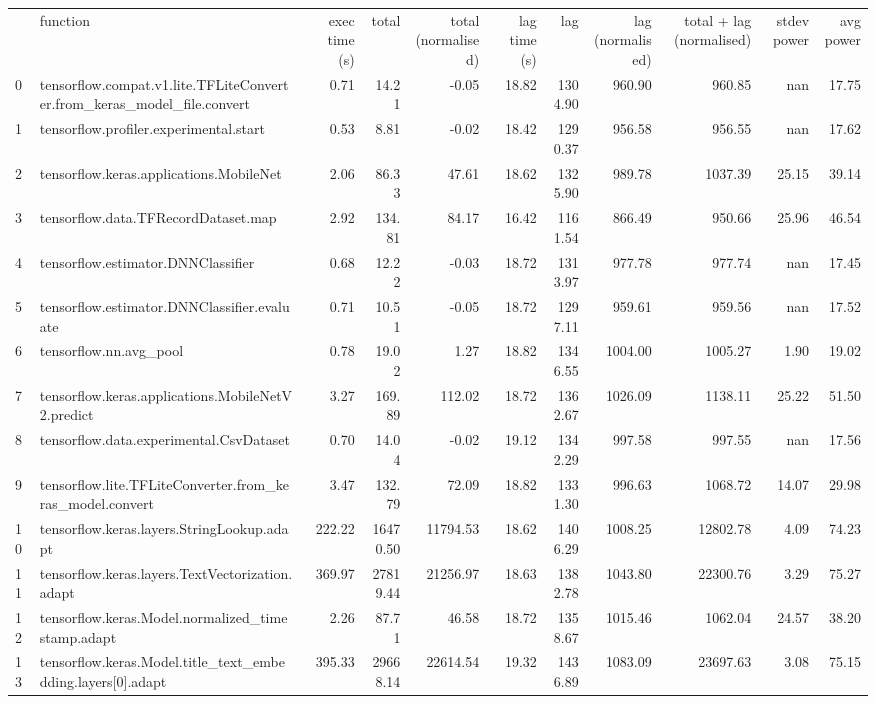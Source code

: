\begin{tabular}{llrrrrrrrrr}
 & function & exec time (s) & total & total (normalised) & lag time (s) & lag & lag (normalised) & total + lag (normalised) & stdev power & avg power \\
0 & tensorflow.compat.v1.lite.TFLiteConverter.from_keras_model_file.convert & 0.71 & 14.21 & -0.05 & 18.82 & 1304.90 & 960.90 & 960.85 & nan & 17.75 \\
1 & tensorflow.profiler.experimental.start & 0.53 & 8.81 & -0.02 & 18.42 & 1290.37 & 956.58 & 956.55 & nan & 17.62 \\
2 & tensorflow.keras.applications.MobileNet & 2.06 & 86.33 & 47.61 & 18.62 & 1325.90 & 989.78 & 1037.39 & 25.15 & 39.14 \\
3 & tensorflow.data.TFRecordDataset.map & 2.92 & 134.81 & 84.17 & 16.42 & 1161.54 & 866.49 & 950.66 & 25.96 & 46.54 \\
4 & tensorflow.estimator.DNNClassifier & 0.68 & 12.22 & -0.03 & 18.72 & 1313.97 & 977.78 & 977.74 & nan & 17.45 \\
5 & tensorflow.estimator.DNNClassifier.evaluate & 0.71 & 10.51 & -0.05 & 18.72 & 1297.11 & 959.61 & 959.56 & nan & 17.52 \\
6 & tensorflow.nn.avg_pool & 0.78 & 19.02 & 1.27 & 18.82 & 1346.55 & 1004.00 & 1005.27 & 1.90 & 19.02 \\
7 & tensorflow.keras.applications.MobileNetV2.predict & 3.27 & 169.89 & 112.02 & 18.72 & 1362.67 & 1026.09 & 1138.11 & 25.22 & 51.50 \\
8 & tensorflow.data.experimental.CsvDataset & 0.70 & 14.04 & -0.02 & 19.12 & 1342.29 & 997.58 & 997.55 & nan & 17.56 \\
9 & tensorflow.lite.TFLiteConverter.from_keras_model.convert & 3.47 & 132.79 & 72.09 & 18.82 & 1331.30 & 996.63 & 1068.72 & 14.07 & 29.98 \\
10 & tensorflow.keras.layers.StringLookup.adapt & 222.22 & 16470.50 & 11794.53 & 18.62 & 1406.29 & 1008.25 & 12802.78 & 4.09 & 74.23 \\
11 & tensorflow.keras.layers.TextVectorization.adapt & 369.97 & 27819.44 & 21256.97 & 18.63 & 1382.78 & 1043.80 & 22300.76 & 3.29 & 75.27 \\
12 & tensorflow.keras.Model.normalized_timestamp.adapt & 2.26 & 87.71 & 46.58 & 18.72 & 1358.67 & 1015.46 & 1062.04 & 24.57 & 38.20 \\
13 & tensorflow.keras.Model.title_text_embedding.layers[0].adapt & 395.33 & 29668.14 & 22614.54 & 19.32 & 1436.89 & 1083.09 & 23697.63 & 3.08 & 75.15 \\

\end{tabular}

